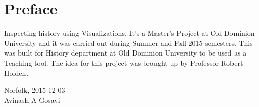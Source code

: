 \section*{Preface}

Inspecting history using Visualizations. It's a Master's Project at Old Dominion University and it was carried out during Summer and Fall 2015 semesters. This was built for History department at Old Dominion University to be used as a Teaching tool. The idea for this project was brought up by Professor Robert Holden.\\[2cm]

\begin{center}
Norfolk, 2015-12-03\\[1pc]
Avinash A Gosavi
\end{center}